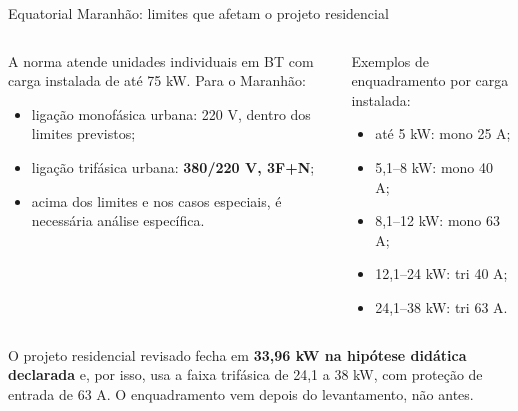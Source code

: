 \begin{frame}[shrink=4]{Equatorial Maranhão: limites que afetam o projeto residencial}
\small
\begin{columns}[T,onlytextwidth]
\begin{caixaNorma}[title=NT.00001.EQTL Rev.09]
A norma atende unidades individuais em BT com carga instalada de até 75 kW. Para o Maranhão:
\begin{itemize}
\item ligação monofásica urbana: 220 V, dentro dos limites previstos;
\item ligação trifásica urbana: \textbf{380/220 V, 3F+N};
\item acima dos limites e nos casos especiais, é necessária análise específica.
\end{itemize}
\end{caixaNorma}
\begin{caixaProjeto}[title=Tabela 1 — 220/380 V]
Exemplos de enquadramento por carga instalada:
\begin{itemize}
\item até 5 kW: mono 25 A;
\item 5,1--8 kW: mono 40 A;
\item 8,1--12 kW: mono 63 A;
\item 12,1--24 kW: tri 40 A;
\item 24,1--38 kW: tri 63 A.
\end{itemize}
\end{caixaProjeto}
\end{columns}
\begin{caixaObs}
O projeto residencial revisado fecha em \textbf{33,96 kW na hipótese didática declarada} e, por isso, usa a faixa trifásica de 24,1 a 38 kW, com proteção de entrada de 63 A. O enquadramento vem depois do levantamento, não antes.
\end{caixaObs}
\end{frame}

